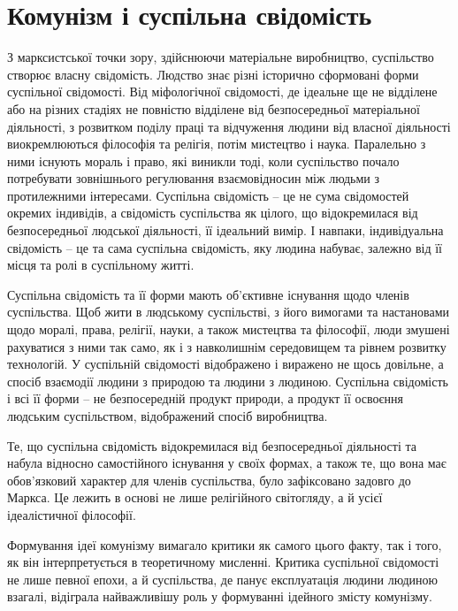 \documentclass[12pt,a4paper,openany]{book}
\begin{document}
\section{Комунізм і суспільна свідомість}
\label{sec:10_kommunizm_soznanie}

З марксистської точки зору, здійснюючи матеріальне виробництво, суспільство створює власну свідомість. Людство знає різні історично сформовані форми суспільної свідомості. Від міфологічної свідомості, де ідеальне ще не відділене або на різних стадіях не повністю відділене від безпосередньої матеріальної діяльності, з розвитком поділу праці та відчуження людини від власної діяльності виокремлюються філософія та релігія, потім мистецтво і наука. Паралельно з ними існують мораль і право, які виникли тоді, коли суспільство почало потребувати зовнішнього регулювання взаємовідносин між людьми з протилежними інтересами. Суспільна свідомість – це не сума свідомостей окремих індивідів, а свідомість суспільства як цілого, що відокремилася від безпосередньої людської діяльності, її ідеальний вимір. І навпаки, індивідуальна свідомість – це та сама суспільна свідомість, яку людина набуває, залежно від її місця та ролі в суспільному житті.

Суспільна свідомість та її форми мають об’єктивне існування щодо членів суспільства. Щоб жити в людському суспільстві, з його вимогами та настановами щодо моралі, права, релігії, науки, а також мистецтва та філософії, люди змушені рахуватися з ними так само, як і з навколишнім середовищем та рівнем розвитку технологій. У суспільній свідомості відображено і виражено не щось довільне, а спосіб взаємодії людини з природою та людини з людиною. Суспільна свідомість і всі її форми – не безпосередній продукт природи, а продукт її освоєння людським суспільством, відображений спосіб виробництва.

Те, що суспільна свідомість відокремилася від безпосередньої діяльності та набула відносно самостійного існування у своїх формах, а також те, що вона має обов’язковий характер для членів суспільства, було зафіксовано задовго до Маркса. Це лежить в основі не лише релігійного світогляду, а й усієї ідеалістичної філософії.

Формування ідеї комунізму вимагало критики як самого цього факту, так і того, як він інтерпретується в теоретичному мисленні. Критика суспільної свідомості не лише певної епохи, а й суспільства, де панує експлуатація людини людиною взагалі, відіграла найважливішу роль у формуванні ідейного змісту комунізму.
\end{document}
